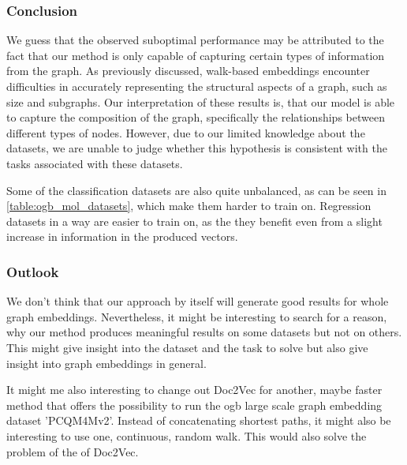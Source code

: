 \subsubsection{Conclusion}
We guess that the observed suboptimal performance may be attributed to the fact that our method is only capable of capturing certain types of information from the graph. As previously discussed, walk-based embeddings encounter difficulties in accurately representing the structural aspects of a graph, such as size and subgraphs. Our interpretation of these results is, that our model is able to capture the composition of the graph, specifically the relationships between different types of nodes. However, due to our limited knowledge about the datasets, we are unable to judge whether this hypothesis is consistent with the tasks associated with these datasets.

Some of the classification datasets are also quite unbalanced, as can be seen in \autoref{table:ogb_mol_datasets}, which make them harder to train on. Regression datasets in a way are easier to train on, as the they benefit even from a slight increase in information in the produced vectors.

\subsubsection{Outlook}
We don't think that our approach by itself will generate good results for whole graph embeddings. Nevertheless, it might be interesting to search for a reason, why our method produces meaningful results on some datasets but not on others. This might give insight into the dataset and the task to solve but also give insight into graph embeddings in general.

It might me also interesting to change out Doc2Vec for another, maybe faster method that offers the possibility to run the ogb large scale graph embedding dataset 'PCQM4Mv2'. Instead of concatenating shortest paths, it might also be interesting to use one, continuous, random walk. This would also solve the problem of the  of Doc2Vec.

